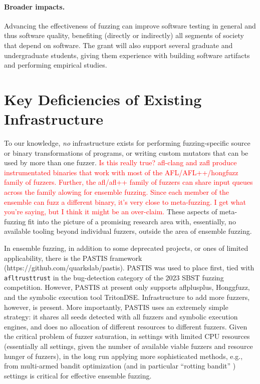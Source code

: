 \documentclass[numbers]{proposalnsf}
\newcommand{\jdh}[1]{\textcolor{red}{#1}}
\begin{document}
\paragraph{Broader impacts.} Advancing the effectiveness of fuzzing can improve software testing in general and
thus software quality, benefiting (directly or indirectly) all
segments of society that depend on software.  The grant
will also support several graduate and undergraduate students, giving them experience with
building software artifacts and performing empirical studies.


\section{Key Deficiencies of Existing Infrastructure}

To our knowledge, \emph{no} infrastructure exists for performing fuzzing-specific source or binary transformations of programs, or writing custom mutators that can be used by more than one fuzzer. \jdh{Is this really true?  afl-clang and zafl produce instrumentated binaries that work with most of the AFL/AFL++/hongfuzz family of fuzzers.  Further, the afl/afl++ family of fuzzers can share input queues across the family alowing for ensemble fuzzing.  Since each member of the ensemble can fuzz a different binary, it's very close to meta-fuzzing.  I get what you're saying, but I think it might be an over-claim.}  These aspects of meta-fuzzing fit into the picture of a promising research area with, essentially, no available tooling beyond individual fuzzers, outside the area of ensemble fuzzing.

In ensemble fuzzing, in addition to some deprecated projects, or ones of limited applicability, there is the PASTIS framework (https://github.com/quarkslab/pastis).  PASTIS was used to place first, tied with {\tt afltrusttrust} in the bug-detection category of the 2023 SBST fuzzing competition.  However, PASTIS at present only supports aflplusplus, Honggfuzz, and the symbolic execution tool TritonDSE.  Infrastructure to add more fuzzers, however, is present.  More importantly, PASTIS uses an extremely simple strategy:  it shares all seeds detected with all fuzzers and symbolic execution engines, and does no allocation of different resources to different fuzzers.  Given the critical problem of fuzzer saturation, in settings with limited CPU resources (essentially all settings, given the number of available viable fuzzers and resource hunger of fuzzers), in the long run applying more sophisticated methods, e.g., from multi-armed bandit optimization (and in particular ``rotting bandit'' \cite{}) settings is critical for effective ensemble fuzzing.
\end{document}
